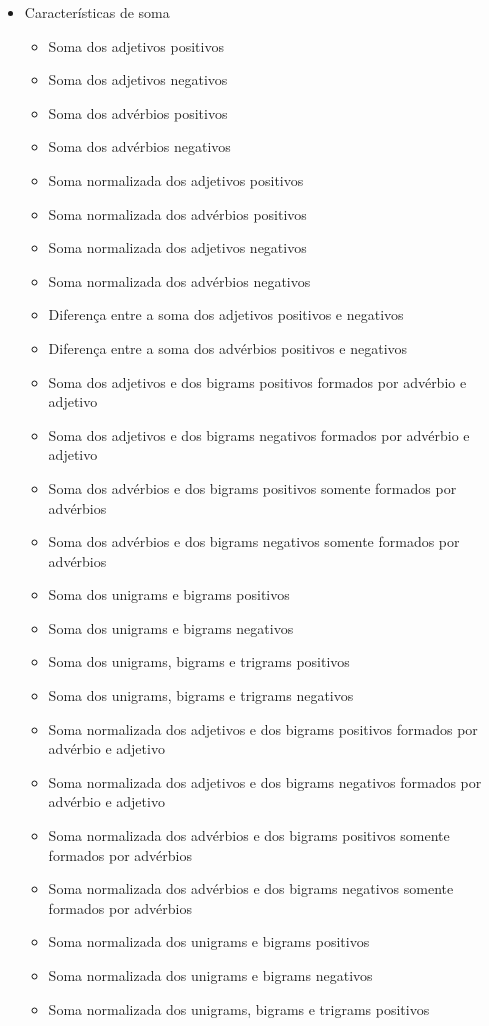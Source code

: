 \begin{itemize}
\item Características de soma %
\begin{itemize}
\item Soma dos adjetivos positivos
\item Soma dos adjetivos negativos
\item Soma dos advérbios positivos
\item Soma dos advérbios negativos
\item Soma normalizada dos adjetivos positivos
\item Soma normalizada dos advérbios positivos
\item Soma normalizada dos adjetivos negativos
\item Soma normalizada dos advérbios negativos
\item Diferença entre a soma dos adjetivos positivos e negativos
\item Diferença entre a soma dos advérbios positivos e negativos
\item Soma dos adjetivos e dos bigrams positivos formados por advérbio e adjetivo
\item Soma dos adjetivos e dos bigrams negativos formados por advérbio e adjetivo
\item Soma dos advérbios e dos bigrams positivos somente formados por advérbios
\item Soma dos advérbios e dos bigrams negativos somente formados por advérbios
\item Soma dos unigrams e bigrams positivos
\item Soma dos unigrams e bigrams negativos
\item Soma dos unigrams, bigrams e trigrams positivos
\item Soma dos unigrams, bigrams e trigrams negativos
\item Soma normalizada dos adjetivos e dos bigrams positivos formados por advérbio e adjetivo
\item Soma normalizada dos adjetivos e dos bigrams negativos formados por advérbio e adjetivo
\item Soma normalizada dos advérbios e dos bigrams positivos somente formados por advérbios
\item Soma normalizada dos advérbios e dos bigrams negativos somente formados por advérbios
\item Soma normalizada dos unigrams e bigrams positivos
\item Soma normalizada dos unigrams e bigrams negativos
\item Soma normalizada dos unigrams, bigrams e trigrams positivos

\end{itemize}
\end{itemize}
